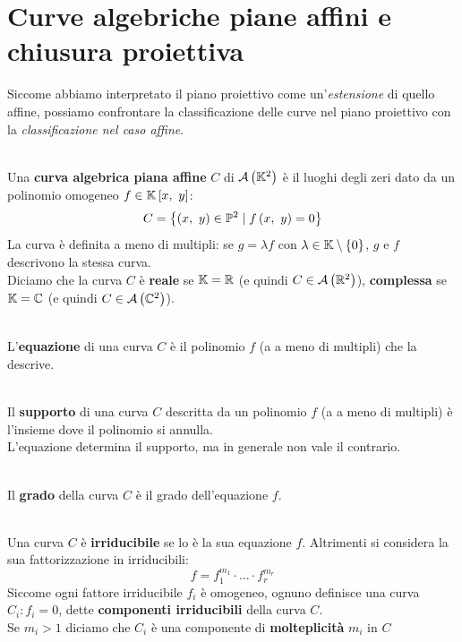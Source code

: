 \section{Curve algebriche piane affini e chiusura proiettiva}
Siccome abbiamo interpretato il piano proiettivo come un'\textit{estensione} di quello affine, possiamo confrontare la classificazione delle curve nel piano proiettivo con la \textit{classificazione nel caso affine}.
\begin{define}~{}\\
	Una \textbf{curva algebrica piana affine} $C$ di ${\mathcal{A}\left(\mathbb{K}^2\right)}$ è il luoghi degli zeri dato da un polinomio omogeneo $f\in\mathbb{K}\left[x,\ y\right]$:
\begin{equation}
	C=\left\{\left(x,\ y\right)\in\proj[2]{\ }\mid f\left(x,\ y\right)=0\right\}
\end{equation}
La curva è definita a meno di multipli: se $g=\lambda f$ con $\lambda\in\mathbb{K}\setminus\left\{0\right\}$, $g$ e $f$ descrivono la stessa curva.\\
Diciamo che la curva $C$ è \textbf{reale} se $\mathbb{K}=\mathbb{R}$ (e quindi $C\in{\ensuremath{\mathcal{A}\left(\mathbb{R}^2\right)}}$), \textbf{complessa} se $\mathbb{K}=\mathbb{C}$ (e quindi $C\in{\ensuremath{\mathcal{A}\left(\mathbb{C}^2\right)}}$).
\end{define}
\begin{define}~{}\\
L'\textbf{equazione} di una curva $C$ è il polinomio $f$ (a a meno di multipli) che la descrive.
\end{define}
\begin{define}~{}\\
Il \textbf{supporto} di una curva $C$ descritta da un polinomio $f$ (a a meno di multipli) è l'insieme dove il polinomio si annulla.\\
L'equazione determina il supporto, ma in generale non vale il contrario.
\end{define}
\begin{define}~{}\\
Il \textbf{grado} della curva $C$ è il grado dell'equazione $f$.
\end{define}
\begin{define}~{}\\
	Una curva $C$ è \textbf{irriducibile} se lo è la sua equazione $f$. Altrimenti si considera la sua fattorizzazione in irriducibili:
	\begin{equation}
		f=f_1^{m_1}\cdot \ldots \cdot f_r^{m_r}
	\end{equation}
	Siccome ogni fattore irriducibile $f_i$ è omogeneo, ognuno definisce una curva $C_i\colon f_i=0$, dette \textbf{componenti irriducibili} della curva $C$.\\
	Se $m_i>1$ diciamo che $C_i$ è una componente di \textbf{molteplicità} $m_i$ in $C$
\end{define}
